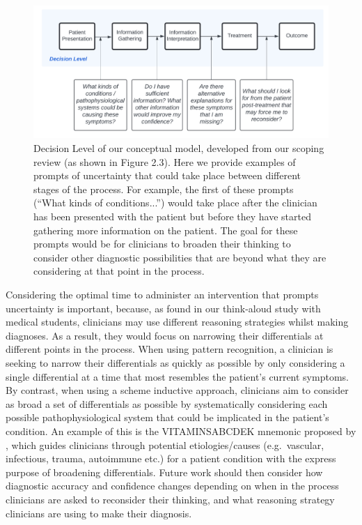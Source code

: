 \documentclass[a4paper, nobind]{templates/ociamthesis}
\begin{document}
\begin{figure}[H]

{\centering \includegraphics[width=1\linewidth]{./assets/UncertainPrompts} 

}

\caption[Overall Discussion: Conceptual Model for Prompting Uncertainty]{Decision Level of our conceptual model, developed from our scoping review (as shown in Figure 2.3). Here we provide examples of prompts of uncertainty that could take place between different stages of the process. For example, the first of these prompts (“What kinds of conditions...”) would take place after the clinician has been presented with the patient but before they have started gathering more information on the patient. The goal for these prompts would be for clinicians to broaden their thinking to consider other diagnostic possibilities that are beyond what they are considering at that point in the process.}\label{fig:uncertprompts}
\end{figure}

Considering the optimal time to administer an intervention that prompts uncertainty is important, because, as found in our think-aloud study with medical students, clinicians may use different reasoning strategies whilst making diagnoses. As a result, they would focus on narrowing their differentials at different points in the process. When using pattern recognition, a clinician is seeking to narrow their differentials as quickly as possible by only considering a single differential at a time that most resembles the patient's current symptoms. By contrast, when using a scheme inductive approach, clinicians aim to consider as broad a set of differentials as possible by systematically considering each possible pathophysiological system that could be implicated in the patient's condition. An example of this is the VITAMINSABCDEK mnemonic proposed by \textcite{zabidi-hussin2016}, which guides clinicians through potential etiologies/causes (e.g.~vascular, infectious, trauma, autoimmune etc.) for a patient condition with the express purpose of broadening differentials. Future work should then consider how diagnostic accuracy and confidence changes depending on when in the process clinicians are asked to reconsider their thinking, and what reasoning strategy clinicians are using to make their diagnosis.\\
\end{document}
